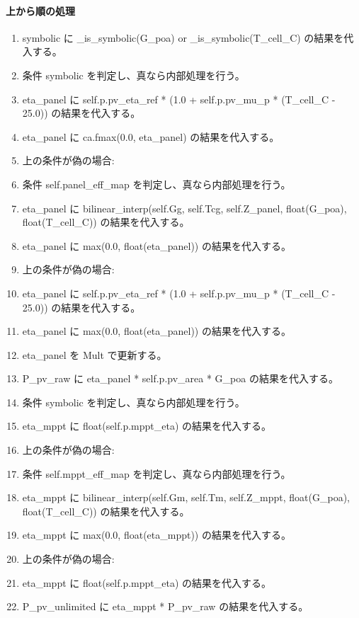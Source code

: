 \documentclass[a4paper,11pt]{article}
\begin{document}
            \paragraph{上から順の処理}
            \begin{enumerate}[leftmargin=1.8em]
            \item symbolic に \_is\_symbolic(G\_poa) or \_is\_symbolic(T\_cell\_C) の結果を代入する。
\item 条件 symbolic を判定し、真なら内部処理を行う。
\item   eta\_panel に self.p.pv\_eta\_ref * (1.0 + self.p.pv\_mu\_p * (T\_cell\_C - 25.0)) の結果を代入する。
\item   eta\_panel に ca.fmax(0.0, eta\_panel) の結果を代入する。
\item   上の条件が偽の場合:
\item   条件 self.panel\_eff\_map を判定し、真なら内部処理を行う。
\item     eta\_panel に bilinear\_interp(self.Gg, self.Tcg, self.Z\_panel, float(G\_poa), float(T\_cell\_C)) の結果を代入する。
\item     eta\_panel に max(0.0, float(eta\_panel)) の結果を代入する。
\item     上の条件が偽の場合:
\item     eta\_panel に self.p.pv\_eta\_ref * (1.0 + self.p.pv\_mu\_p * (T\_cell\_C - 25.0)) の結果を代入する。
\item     eta\_panel に max(0.0, float(eta\_panel)) の結果を代入する。
\item eta\_panel を Mult で更新する。
\item P\_pv\_raw に eta\_panel * self.p.pv\_area * G\_poa の結果を代入する。
\item 条件 symbolic を判定し、真なら内部処理を行う。
\item   eta\_mppt に float(self.p.mppt\_eta) の結果を代入する。
\item   上の条件が偽の場合:
\item   条件 self.mppt\_eff\_map を判定し、真なら内部処理を行う。
\item     eta\_mppt に bilinear\_interp(self.Gm, self.Tm, self.Z\_mppt, float(G\_poa), float(T\_cell\_C)) の結果を代入する。
\item     eta\_mppt に max(0.0, float(eta\_mppt)) の結果を代入する。
\item     上の条件が偽の場合:
\item     eta\_mppt に float(self.p.mppt\_eta) の結果を代入する。
\item P\_pv\_unlimited に eta\_mppt * P\_pv\_raw の結果を代入する。

\end{enumerate}
\end{document}
